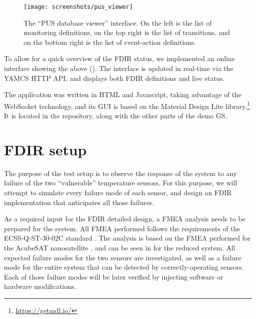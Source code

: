 \documentclass[a4paper,nobib,final]{tufte-book}
\begin{document}
\begin{figure}[h]
	\texttt{[image: screenshots/pus\_viewer]}
	\caption[The ``PUS database viewer'' interface]{The ``\acs{PUS} database viewer'' interface. On the left is the list of monitoring definitions, on the top right is the list of transitions, and on the bottom right is the list of event-action definitions.}
		\label{fig:pusviewer}
\end{figure}
	
To allow for a quick overview of the \acs{FDIR} status, we implemented an online interface showing the above (). The interface is updated in real-time via the \acs{YAMCS} \acs{HTTP} \acs{API}, and displays both \acs{FDIR} definitions and live status.

The application was written in HTML and Javascript, taking advantage of the WebSocket technology, and its GUI is based on the Material Design Lite library.\footnote[]{\url{https://getmdl.io/}} It is located in the repository, along with the other parts of the demo \acl{GS}.

\section{\acs{FDIR} setup}

The purpose of the test setup is to observe the response of the system to any failure of the two ``vulnerable'' temperature sensors. For this purpose, we will attempt to simulate every failure mode of each sensor, and design an \ac{FDIR} implementation that anticipates all those failures.

As a required input for the \ac{FDIR} detailed design, a \ac{FMEA} analysis needs to be prepared for the system. All \ac{FMEA} performed follows the requirements of the ECSS-Q-ST-30-02C standard \autocite{ECSS-Q-ST-30-02C}. The analysis is based on the \ac{FMEA} performed for the AcubeSAT nanosatellite \autocite{retselis_acubesat_fmea_2020}, and can be seen in  for the reduced system. All expected failure modes for the two sensors are investigated, as well as a failure mode for the entire system that can be detected by correctly-operating sensors. Each of those failure modes will be later verified by injecting software or hardware modifications.
\end{document}
